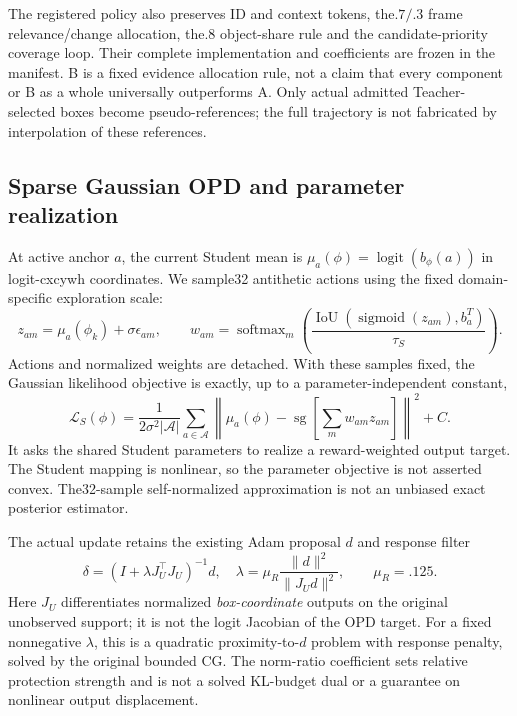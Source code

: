 \documentclass[11pt]{article}
\newcommand{\sg}{\operatorname{sg}}
\begin{document}
The registered policy also preserves ID and context tokens, the$.7/.3$ frame relevance/change allocation, the$.8$ object-share rule and the candidate-priority coverage loop. Their complete implementation and coefficients are frozen in the manifest. B is a fixed evidence allocation rule, not a claim that every component or B as a whole universally outperforms A. Only actual admitted Teacher-selected boxes become pseudo-references; the full trajectory is not fabricated by interpolation of these references.

\subsection{Sparse Gaussian OPD and parameter realization}
At active anchor $a$, the current Student mean is $\mu_a(\phi)=\operatorname{logit}(b_\phi(a))$ in logit-cxcywh coordinates. We sample32 antithetic actions using the fixed domain-specific exploration scale:
\begin{equation}
z_{am}=\mu_a(\phi_k)+\sigma\epsilon_{am},\qquad
w_{am}=\operatorname{softmax}_m\!\left(\frac{\operatorname{IoU}(\operatorname{sigmoid}(z_{am}),b_a^T)}{\tau_S}\right).
\end{equation}
Actions and normalized weights are detached. With these samples fixed, the Gaussian likelihood objective is exactly, up to a parameter-independent constant,
\begin{equation}
\mathcal L_S(\phi)=\frac{1}{2\sigma^2|\mathcal A|}\sum_{a\in\mathcal A}
\left\|\mu_a(\phi)-\sg\!\left[\sum_m w_{am}z_{am}\right]\right\|^2+C.
\end{equation}
It asks the shared Student parameters to realize a reward-weighted output target. The Student mapping is nonlinear, so the parameter objective is not asserted convex. The32-sample self-normalized approximation is not an unbiased exact posterior estimator.

The actual update retains the existing Adam proposal $d$ and response filter
\begin{equation}
\delta=(I+\lambda J_U^\top J_U)^{-1}d,\quad
\lambda=\mu_R\frac{\|d\|^2}{\|J_Ud\|^2},\qquad\mu_R=.125.
\end{equation}
Here $J_U$ differentiates normalized \emph{box-coordinate} outputs on the original unobserved support; it is not the logit Jacobian of the OPD target. For a fixed nonnegative $\lambda$, this is a quadratic proximity-to-$d$ problem with response penalty, solved by the original bounded CG. The norm-ratio coefficient sets relative protection strength and is not a solved KL-budget dual or a guarantee on nonlinear output displacement.
\end{document}
